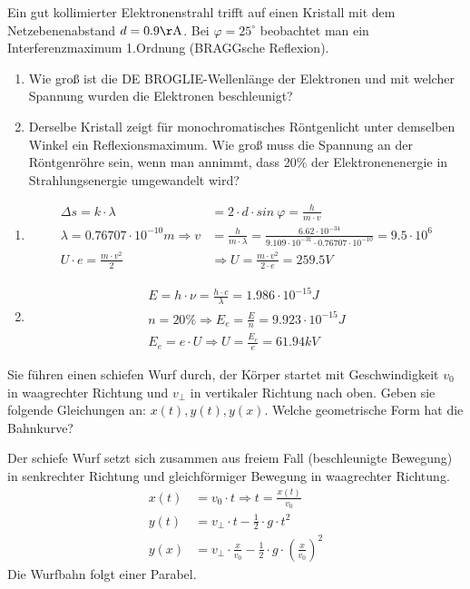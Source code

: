 \documentclass[12pt,a4paper,ngerman]{article}
\begin{document}
\begin{framed}
Ein gut kollimierter Elektronenstrahl trifft auf einen Kristall mit dem Netzebenenabstand $d = 0.9 \mathrm{\AA}$. Bei $\varphi = 25^\circ$ beobachtet man ein Interferenzmaximum 1.Ordnung (BRAGGsche Reflexion). 
\begin{enumerate}
\item Wie groß ist die DE BROGLIE-Wellenlänge der Elektronen und mit welcher Spannung wurden die Elektronen beschleunigt?
\item Derselbe Kristall zeigt für monochromatisches Röntgenlicht unter demselben Winkel ein Reflexionsmaximum. Wie groß muss die Spannung an der Röntgenröhre sein, wenn man annimmt, dass 20\% der Elektronenenergie in Strahlungsenergie umgewandelt wird?
\end{enumerate} 
\end{framed}

\begin{enumerate}
\item \begin{align*}
\Delta s = k \cdot \lambda &= 2 \cdot d \cdot sin \ \varphi = \frac{h}{m \cdot v} \\
\lambda = 0.76707\cdot 10^{-10}m \Rightarrow v &= \frac{h}{m \cdot \lambda} = \frac{6.62 \cdot 10^{-34}}{9.109 \cdot 10^{-31} \cdot 0.76707 \cdot 10^{-10}} = 9.5 \cdot 10^6 \\
U \cdot e = \frac{m \cdot v^2}{2} &\Rightarrow U = \frac{m \cdot v^2}{2 \cdot e} = 259.5 V
\end{align*}
\item \begin{align*}
E = h \cdot \nu = \frac{h \cdot c}{\lambda} = 1.986 \cdot 10^{-15} J \\
n = 20\% \Rightarrow E_e = \frac{E}{n} = 9.923 \cdot 10^{-15}J \\
E_e = e \cdot U \Rightarrow U = \frac{E_e}{e} = 61.94 kV
\end{align*}
\end{enumerate}

\pagebreak

\begin{framed}
Sie führen einen schiefen Wurf durch, der Körper startet mit Geschwindigkeit $v_0$ in waagrechter Richtung und $v_{\bot}$ in vertikaler Richtung nach oben. Geben sie folgende Gleichungen an: $x(t),y(t),y(x)$. Welche geometrische Form hat die Bahnkurve?
\end{framed}
Der schiefe Wurf setzt sich zusammen aus freiem Fall (beschleunigte Bewegung) in senkrechter Richtung und gleichförmiger Bewegung in waagrechter Richtung. 
\begin{align*}
x(t) &= v_0 \cdot t \Rightarrow t = \frac{x(t)}{v_0} \\
y(t) &= v_\bot \cdot t - \frac{1}{2}\cdot g \cdot t^2 \\
y(x) &= v_\bot \cdot \frac{x}{v_0} - \frac{1}{2} \cdot g \cdot \left(\frac{x}{v_0}\right)^2
\end{align*}
Die Wurfbahn folgt einer Parabel. 
\end{document}
